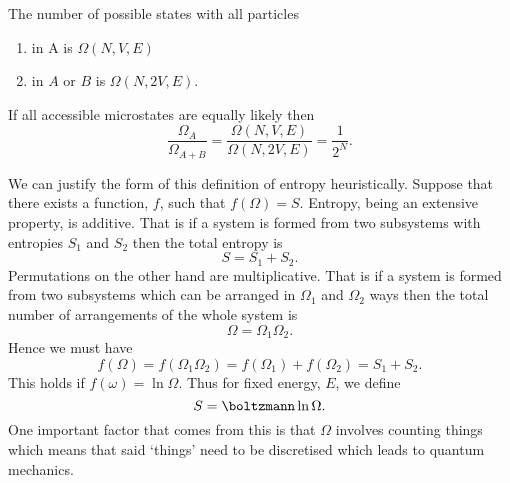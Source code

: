     The number of possible states with all particles
    \begin{enumerate}
        \item in A is \(\Omega(N, V, E)\)
        \item in \(A\) or \(B\) is \(\Omega(N, 2V, E)\).
    \end{enumerate}
    If all accessible microstates are equally likely then
    \[\frac{\Omega_A}{\Omega_{A+B}} = \frac{\Omega(N, V, E)}{\Omega(N, 2V, E)} = \frac{1}{2^N}.\]
    
    We can justify the form of this definition of entropy heuristically.
    Suppose that there exists a function, \(f\), such that \(f(\Omega) = S\).
    Entropy, being an extensive property, is additive.
    That is if a system is formed from two subsystems with entropies \(S_1\) and \(S_2\) then the total entropy is
    \[S = S_1 + S_2.\]
    Permutations on the other hand are multiplicative.
    That is if a system is formed from two subsystems which can be arranged in \(\Omega_1\) and \(\Omega_2\) ways then the total number of arrangements of the whole system is
    \[\Omega = \Omega_1\Omega_2.\]
    Hence we must have
    \[f(\Omega) = f(\Omega_1\Omega_2) = f(\Omega_1) + f(\Omega_2) = S_1 + S_2.\]
    This holds if \(f(\omega) = \ln\Omega\).
    Thus for fixed energy, \(E\), we define
    \[S = \boltzmann\ln\Omega.\]
    One important factor that comes from this is that \(\Omega\) involves counting things which means that said `things' need to be discretised which leads to quantum mechanics.
    
